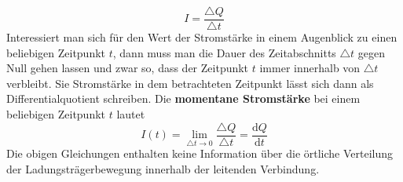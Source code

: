 \begin{equation}
\boxed{I=\dfrac{\triangle Q}{\triangle t}}
\end{equation}
Interessiert man sich für den Wert der Stromstärke in einem Augenblick zu einen beliebigen Zeitpunkt $t$, dann muss man die Dauer des Zeitabschnitts $\triangle t$ gegen Null gehen lassen und zwar so, dass der Zeitpunkt $t$ immer innerhalb von $\triangle t$ verbleibt. Sie Stromstärke in dem betrachteten Zeitpunkt lässt sich dann als Differentialquotient schreiben.
Die \textbf{momentane Stromstärke} bei einem beliebigen Zeitpunkt $t$ lautet
\begin{equation}
\boxed{I\left(t\right)=\displaystyle \lim_{\triangle t\rightarrow 0}\dfrac{\triangle Q}{\triangle t}=\dfrac{\text{d}Q}{\text{d}t}}
\end{equation}
Die obigen Gleichungen enthalten keine Information über die örtliche Verteilung der Ladungsträgerbewegung innerhalb der leitenden Verbindung.
